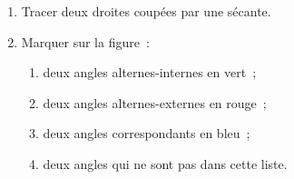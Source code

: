 \documentclass[exercice]{thedocument}%
\begin{document}
%
\begin{enumerate}
    \item Tracer deux droites coupées par une sécante.
    \item Marquer sur la figure~:
    \begin{enumerate}
        \item deux angles alternes-internes en vert~;
        \item deux angles alternes-externes en rouge~;
        \item deux angles correspondants en bleu~;
        \item deux angles qui ne sont pas dans cette liste.
    \end{enumerate}
\end{enumerate}
\end{document}
